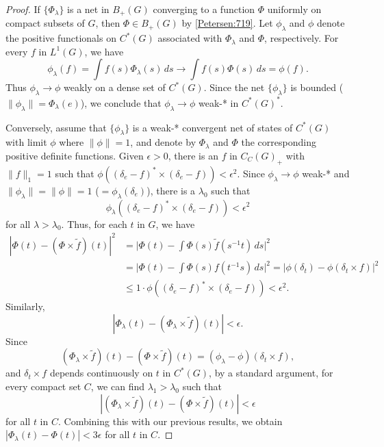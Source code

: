 \documentclass{book}
\begin{document}
\begin{proof}
  If \(\{\Phi_\lambda\}\) is a net in \(B_+(G)\) converging to a function \(\Phi\) uniformly on 
  compact subsets of \(G\), then \(\Phi\in B_+(G)\) by \ref{Petersen:719}. Let \(\phi_\lambda\) and \(\phi\) denote the positive
  functionals on \(C^*(G)\) associated with \(\Phi_\lambda\) and \(\Phi\), respectively. For every \(f\) in
  \(L^1(G)\), we have
  \[
    \phi_\lambda(f)=\int f(s)\Phi_\lambda(s)\,ds\rightarrow\int f(s)\Phi(s)\,ds=\phi(f).
  \] 
  Thus \(\phi_\lambda\rightarrow\phi\) weakly on a dense set of \(C^*(G)\).
  Since the net \(\{\phi_\lambda\}\) is bounded (\(\|\phi_\lambda\|=\Phi_\lambda(e)\)), we conclude that \(\phi_\lambda\rightarrow\phi\) weak-* in \(C^*(G)^*\).\par
  Conversely, assume that \(\{\phi_\lambda\}\) is a weak-* convergent net of states of \(C^*(G)\)
  with limit \(\phi\) where \(\|\phi\|=1\), and denote by \(\Phi_\lambda\) and \(\Phi\) the corresponding positive
  definite functions. Given \(\epsilon >0\), there is an \(f\) in \(C_C(G)_+\) with \(\|f\|_1 = 1\) such
  that \(\phi((\delta_e - f)^* \times(\delta_e -f))<\epsilon^2\). Since \(\phi_\lambda \rightarrow \phi\) weak-* and 
  \(\|\phi_\lambda\|=\|\phi\|=1\) (\(=\phi_\lambda(\delta_e)\)), there is a \(\lambda_0\) such that
  \[
    \phi_\lambda((\delta_e-f)^*\times(\delta_e-f))<\epsilon^2
  \]
  for all \(\lambda>\lambda_0\). Thus, for each \(t\) in \(G\), we have
  \begin{align*}
    |\Phi(t)-(\Phi\times \tilde{f})(t)|^2&=\vert \Phi(t)-\int\Phi(s)\tilde{f}(s^{-1}t)\,ds\vert^2\\
    &=\vert\Phi(t)-\int\Phi(s) f(t^{-1}s)\,ds\vert^2=|\phi(\delta_t)-\phi(\delta_t\times f)|^2\\
    &\leq 1\cdot\phi((\delta_e-f)^*\times(\delta_e-f))<\epsilon^2.
  \end{align*}
  Similarly,
  \[
    |\Phi_\lambda(t)-(\Phi_\lambda\times\tilde{f})(t)|<\epsilon.
  \]
  Since
  \[
    (\Phi_\lambda\times\tilde{f})(t)-(\Phi\times\tilde{f})(t)=(\phi_\lambda-\phi)(\delta_t\times f),
  \]
  and \(\delta_t\times f\) depends continuously on \(t\) in \(C^*(G)\), by a standard argument,
  for every compact set \(C\), we can find \(\lambda_1>\lambda_0\) such that
  \[
    |(\Phi_\lambda\times\tilde{f})(t)-(\Phi\times\tilde{f})(t)|<\epsilon
  \]
  for all \(t\) in \(C\). Combining this with our previous results, we obtain \(|\Phi_\lambda(t)-\Phi(t)|<3\epsilon\) for all \(t\) in \(C\).
\end{proof}
\end{document}
